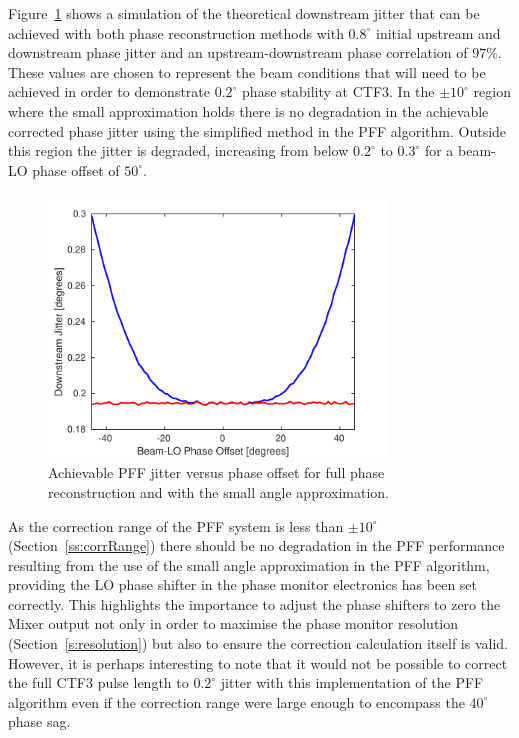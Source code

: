Figure~\ref{f:phaseRecJitSim} shows a simulation of the theoretical downstream jitter that can be achieved with both phase reconstruction methods with \(0.8^\circ\) initial upstream and downstream phase jitter and an upstream-downstream phase correlation of \(97\%\). These values are chosen to represent the beam conditions that will need to be achieved in order to demonstrate \(0.2^\circ\) phase stability at CTF3. In the \(\pm10^\circ\) region where the small approximation holds there is no degradation in the achievable corrected phase jitter using the simplified method in the PFF algorithm. Outside this region the jitter is degraded, increasing from below \(0.2^\circ\) to \(0.3^\circ\) for a beam-LO phase offset of \(50^\circ\). 

\begin{figure}
  \centering
  \includegraphics[width=0.8\textwidth]{Figures/commissioning/phaseRecJitSim}
  \caption{Achievable PFF jitter versus phase offset for full phase reconstruction and with the small angle approximation.}
  \label{f:phaseRecJitSim}
\end{figure}

As the correction range of the PFF system is less than \(\pm10^\circ\) (Section~\ref{ss:corrRange}) there should be no degradation in the PFF performance resulting from the use of the small angle approximation in the PFF algorithm, providing the LO phase shifter in the phase monitor electronics has been set correctly. This highlights the importance to adjust the phase shifters to zero the Mixer output not only in order to maximise the phase monitor resolution (Section~\ref{s:resolution}) but also to ensure the correction calculation itself is valid. However, it is perhaps interesting to note that it would not be possible to correct the full CTF3 pulse length to \(0.2^\circ\) jitter with this implementation of the PFF algorithm even if the correction range were large enough to encompass the \(40^\circ\) phase sag.

